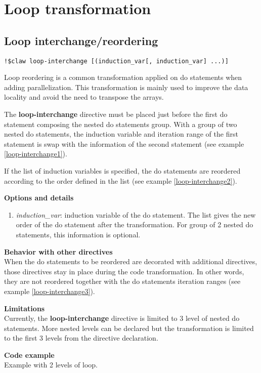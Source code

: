 \section{Loop transformation}
\subsection{Loop interchange/reordering}
\begin{lstlisting}
!$claw loop-interchange [(induction_var[, induction_var] ...)]
\end{lstlisting}

Loop reordering is a common transformation applied on do statements when adding parallelization. This transformation is mainly used to improve the data locality and avoid the need to transpose the arrays.

The \textbf{loop-interchange} directive must be placed just before the first do statement composing the nested do statements group. With a group of two nested do statements, the induction variable and iteration range of the first statement is swap with the information of the second statement (see example \ref{loop-interchange1}).

If the list of induction variables is specified, the do statements are reordered according to the order defined in the list (see example \ref{loop-interchange2}).

\textbf{Options and details}
\begin{enumerate}
\item \textit{induction\_var}: induction variable of the do statement. The list gives the new order of the do statement after the transformation. For group of 2 nested do statements, this information is optional.
\end{enumerate}


\textbf{Behavior with other directives}\\
When the do statements to be reordered are decorated with additional directives, those directives stay in place during the code transformation. In other words, they are not reordered together with the do statements iteration ranges (see example \ref{loop-interchange3}).

\textbf{Limitations}\\
Currently, the \textbf{loop-interchange} directive is limited to 3 level of nested do statements. More nested levels can be declared but the transformation is limited to the first 3 levels from the directive declaration.

\textbf{Code example}\\\label{loop-interchange1}
Example with 2 levels of loop.

